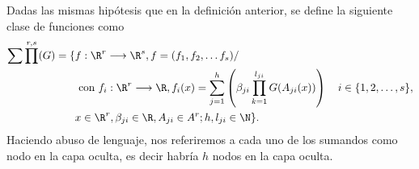 \begin{definicion} 
    Dadas las mismas hipótesis que en la definición anterior, se define la siguiente clase de funciones como 
    \begin{equation}
        \begin{split}
            \sum \prod^{r, s}(G) 
            = 
        \{ 
            & f: \R ^r \longrightarrow \R^s, f= (f_1, f_2, \ldots f_s)  / \quad 
            \\ &
            \text{ con } f_i : \R ^r\longrightarrow \R, 
            f_i(x)=\sum_{j = 1} ^h 
            \left(
            \beta_{j i} \prod_{k=1}^{l_{j i}} G(A_{j i}(x))
            \right)
             \quad i \in \{1,2,\ldots, s\}, \\
            & x  \in \R ^r, \beta_{j i} \in \R, A_{j i}\in A^r; h,l_{j i} \in \N 
        \}.
        \end{split}
    \end{equation}
    Haciendo abuso de lenguaje, nos referiremos a cada uno de los sumandos como 
    nodo en la capa oculta, es decir habría $h$ nodos en la capa oculta. 
\end{definicion}


